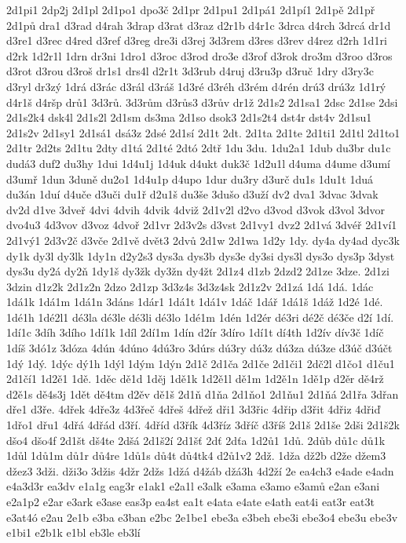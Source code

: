 {2d1pi1
2dp2j
2d1pl
2d1po1
dpo3č
2d1pr
2d1pu1
2d1pá1
2d1pí1
2d1pě
2d1př
2d1pů
dra1
d3rad
d4rah
3drap
d3rat
d3raz
d2r1b
d4r1c
3drca
d4rch
3drcá
dr1d
d3re1
d3rec
d4red
d3ref
d3reg
dre3i
d3rej
3d3rem
d3res
d3rev
d4rez
d2rh
1d1ri
d2rk
1d2r1l
1drn
dr3ni
1dro1
d3roc
d3rod
dro3e
d3rof
d3rok
dro3m
d3roo
d3ros
d3rot
d3rou
d3roš
dr1s1
drs4l
d2r1t
3d3rub
d4ruj
d3ru3p
d3ruč
1dry
d3ry3c
d3ryl
dr3zý
1drá
d3rác
d3rál
d3ráš
1d3ré
d3réh
d3rém
d4rén
drú3
drú3z
1d1rý
d4r1š
d4ršp
drů1
3d3rů.
3d3rům
d3růs3
d3rův
dr1ž
2d1s2
2d1sa1
2dsc
2d1se
2dsi
2d1s2k4
dsk4l
2d1s2l
2d1sm
ds3ma
2d1so
dsok3
2d1s2t4
dst4r
dst4v
2d1su1
2d1s2v
2d1sy1
2d1sá1
dsá3z
2dsé
2d1sí
2d1t
2dt.
2d1ta
2d1te
2d1ti1
2d1tl
2d1to1
2d1tr
2d2ts
2d1tu
2dty
d1tá
2d1té
2dtó
2dtř
1du
3du.
1du2a1
1dub
du3br
du1c
dudá3
duf2
du3hy
1dui
1d4u1j
1d4uk
d4ukt
duk3č
1d2u1l
d4uma
d4ume
d3umí
d3umř
1dun
3duně
du2o1
1d4u1p
d4upo
1dur
du3ry
d3urč
du1s
1du1t
1duá
du3án
1duí
d4uče
d3uči
du1ř
d2u1š
du3še
3dušo
d3uží
dv2
dva1
3dvac
3dvak
dv2d
d1ve
3dveř
4dvi
4dvih
4dvik
4dviž
2d1v2l
d2vo
d3vod
d3vok
d3vol
3dvor
dvo4u3
4d3vov
d3voz
4dvoř
2d1vr
2d3v2s
d3vst
2d1vy1
dvz2
2d1vá
3dvéř
2d1ví1
2d1vý1
2d3v2č
d3vče
2d1vě
dvět3
2dvů
2d1w
2d1wa
1d2y
1dy.
dy4a
dy4ad
dyc3k
dy1k
dy3l
dy3lk
1dy1n
d2y2s3
dys3a
dys3b
dys3e
dy3si
dys3l
dys3o
dys3p
3dyst
dys3u
dy2á
dy2ň
1dy1š
dy3žk
dy3žn
dy4žt
2d1z4
d1zb
2dzd2
2d1ze
3dze.
2d1zi
3dzin
d1z2k
2d1z2n
2dzo
2d1zp
3d3z4s
3d3z4sk
2d1z2v
2d1zá
1dá
1dá.
1dác
1dá1k
1dá1m
1dá1n
3dáns
1dár1
1dá1t
1dá1v
1dáč
1dář
1dá1š
1dáž
1d2é
1dé.
1dé1h
1dé2l1
dé3la
dé3le
dé3li
dé3lo
1dé1m
1dén
1d2ér
dé3ri
dé2č
dé3če
d2í
1dí.
1dí1c
3díh
3dího
1dí1k
1díl
2dí1m
1dín
d2ír
3díro
1dí1t
dí4th
1d2ív
dív3č
1díč
1díš
3dó1z
3dóza
4dún
4dúno
4dú3ro
3dúrs
dú3ry
dú3z
dú3za
dú3ze
d3úč
d3účt
1dý
1dý.
1dýc
dý1h
1dýl
1dým
1dýn
2d1č
2d1ča
2d1če
2d1či1
2dč2l
d1čo1
d1ču1
2d1čí1
1d2ě1
1dě.
1děc
dě1d
1děj
1dě1k
1d2ě1l
dě1m
1d2ě1n
1dě1p
d2ěr
dě4rž
d2ě1s
dě4s3j
1dět
dě4tm
d2ěv
dě1š
2d1ň
d1ňa
2d1ňo1
2d1ňu1
2d1ňá
2d1řa
3dřan
dře1
d3ře.
4dřek
4dře3z
4d3řeč
4dřeš
4dřež
dři1
3d3řic
4dřip
d3řit
4dřiz
4dřiď
1dřo1
dřu1
4dřá
4dřád
d3ří.
4dříd
d3řík
4d3říz
3dříč
d3říš
2d1š
2d1še
2dši
2d1š2k
dšo4
dšo4f
2d1št
dš4te
2dšá
2d1š2í
2d1šť
2dť
2dťa
1d2ů1
1dů.
2důb
dů1c
dů1k
1důl
1dů1m
dů1r
dů4re
1dů1s
dů4t
dů4tk4
d2ů1v2
2dž.
1dža
dž2b
d2že
džem3
džez3
3dži.
dži3o
3džis
4džr
2džs
1džá
d4žáb
džá3h
4d2ží
2e
ea4ch3
e4ade
e4adn
e4a3d3r
ea3dv
e1a1g
eag3r
e1ak1
e2a1l
e3alk
e3ama
e3amo
e3amů
e2an
e3ani
e2a1p2
e2ar
e3ark
e3ase
eas3p
ea4st
ea1t
e4ata
e4ate
e4ath
eat4i
eat3r
eat3t
e3at4ó
e2au
2e1b
e3ba
e3ban
e2bc
2e1be1
ebe3a
e3beh
ebe3i
ebe3o4
ebe3u
ebe3v
e1bi1
e2b1k
e1bl
eb3le
eb3lí
}
